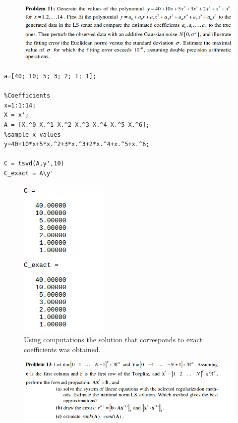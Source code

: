 \documentclass[eng,openany]{mgr}
\begin{document}
\begin{figure}[h]
\centering
\includegraphics[width=0.7\linewidth]{screenshot031}
\label{fig:screenshot031}
\end{figure}
\begin{lstlisting}
a=[40; 10; 5; 3; 2; 1; 1];

%Coefficients
x=1:1:14;
X = x';
A = [X.^0 X.^1 X.^2 X.^3 X.^4 X.^5 X.^6];
%sample x values
y=40+10*x+5*x.^2+3*x.^3+2*x.^4+x.^5+x.^6;

C = tsvd(A,y',10)
C_exact = A\y'
\end{lstlisting}
\begin{figure}[h]
\centering
\includegraphics[width=0.2\linewidth]{screenshot032}
\caption{Using computations the solution that corresponds to exact coefficients was obtained.}
\label{fig:screenshot032}
\end{figure}
\newpage
\begin{figure}[h]
\centering
\includegraphics[width=0.6\linewidth]{screenshot034}

\label{fig:screenshot034}
\end{figure}
\end{document}
